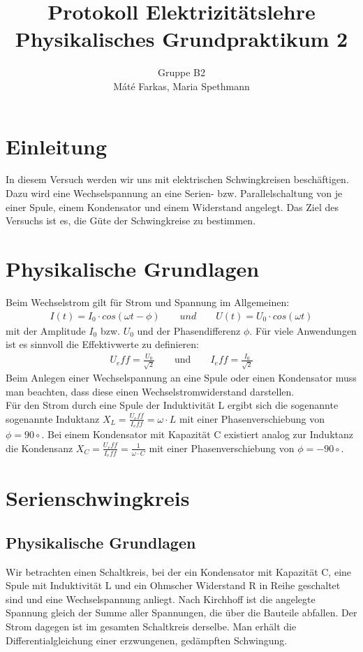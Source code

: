 \documentclass[12pt,a4paper]{article}
\author{Gruppe B2 \\ Máté Farkas, Maria Spethmann}
\title{Protokoll Elektrizitätslehre \\ Physikalisches Grundpraktikum 2}
\begin{document}
	\maketitle
	\thispagestyle{empty} %
	\newpage
	\pagestyle{headings} %
	\tableofcontents
	\newpage

\section{Einleitung}
In diesem Versuch werden wir uns mit elektrischen Schwingkreisen beschäftigen. Dazu wird eine Wechselspannung an eine Serien- bzw. Parallelschaltung von je einer Spule, einem Kondensator und einem Widerstand angelegt. Das Ziel des Versuchs ist es, die Güte der Schwingkreise zu bestimmen.
\section{Physikalische Grundlagen}
Beim Wechselstrom gilt für Strom und Spannung im Allgemeinen:
\begin{align}
I(t)=I_0\cdot cos(\omega t - \phi) \qquad und \qquad U(t)=U_0\cdot cos(\omega t)
\end{align}
mit der Amplitude $I_0$ bzw. $U_0$ und der Phasendifferenz $\phi$.
Für viele Anwendungen ist es sinnvoll die Effektivwerte zu definieren:
\begin{align}
U_eff = \frac{U_0}{\sqrt{2}} \qquad \text{und} \qquad I_eff = \frac{I_0}{\sqrt{2}}
\end{align}
Beim Anlegen einer Wechselspannung an eine Spule oder einen Kondensator muss man beachten, dass diese einen Wechselstromwiderstand darstellen.\\
Für den Strom durch eine Spule der Induktivität L ergibt sich die sogenannte sogenannte Induktanz $X_L=\frac{U_eff}{I_eff}=\omega \cdot L$ mit einer Phasenverschiebung von $\phi=90\circ$.
Bei einem Kondensator mit Kapazität C existiert analog zur Induktanz die Kondensanz $X_C=\frac{U_eff}{I_eff}=\frac{1}{\omega \cdot C}$ mit einer Phasenverschiebung von $\phi=-90\circ$.
\section{Serienschwingkreis}
\subsection{Physikalische Grundlagen}
Wir betrachten einen Schaltkreis, bei der ein Kondensator mit Kapazität C, eine Spule mit Induktivität L und ein Ohmscher Widerstand R in Reihe geschaltet sind und eine Wechselspannung anliegt. Nach Kirchhoff ist die angelegte Spannung gleich der Summe aller Spannungen, die über die Bauteile abfallen. Der Strom dagegen ist im gesamten Schaltkreis derselbe. Man erhält die Differentialgleichung einer erzwungenen, gedämpften Schwingung. 
\end{document}
